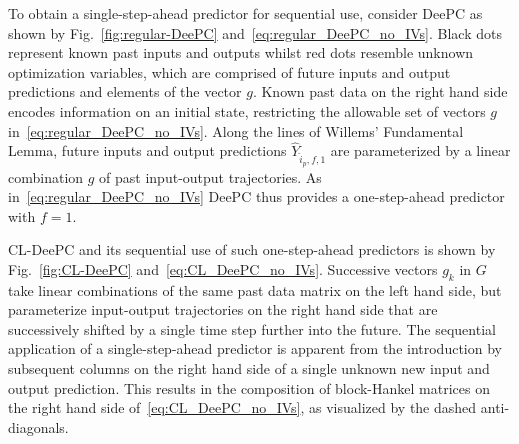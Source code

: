 To obtain a single-step-ahead predictor for sequential use, consider \ac{DeePC} as shown by Fig.~\ref{fig:regular-DeePC} and~\eqref{eq:regular_DeePC_no_IVs}. Black dots represent known past inputs and outputs whilst red dots resemble unknown optimization variables, which are comprised of future inputs and output predictions and elements of the vector $g$. Known past data on the right hand side encodes information on an initial state, restricting the allowable set of vectors $g$ in~\eqref{eq:regular_DeePC_no_IVs}. Along the lines of Willems' Fundamental Lemma, future inputs and output predictions $\widehat{Y}_{\hat{i}_p,f,1}$ are parameterized by a linear combination $g$ of past input-output trajectories. As in~\eqref{eq:regular_DeePC_no_IVs} \ac{DeePC} thus provides a one-step-ahead predictor with $f=1$.

\ac{CL-DeePC} and its sequential use of such one-step-ahead predictors is shown by Fig.~\ref{fig:CL-DeePC} and~\eqref{eq:CL_DeePC_no_IVs}. Successive vectors $g_k$ in $G$ take linear combinations of the same past data matrix on the left hand side, but parameterize input-output trajectories on the right hand side that are successively shifted by a single time step further into the future. The sequential application of a single-step-ahead predictor is apparent from the introduction by subsequent columns on the right hand side of a single unknown new input and output prediction. This results in the composition of block-Hankel matrices on the right hand side of~\eqref{eq:CL_DeePC_no_IVs}, as visualized by the dashed anti-diagonals.
%
